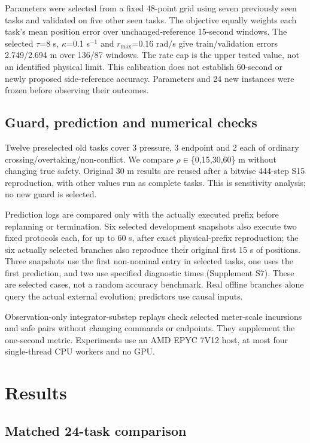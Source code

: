 \documentclass[conference]{IEEEtran}
\begin{document}
Parameters were selected from a fixed 48-point grid using seven previously seen tasks and validated on five other seen tasks. The objective equally weights each task's mean position error over unchanged-reference 15-second windows. The selected \ensuremath{\tau}=8 s, \ensuremath{\kappa}=0.1 s$^{-1}$ and $r_{\max}$=0.16 rad/s give train/validation errors 2.749/2.694 m over 136/87 windows. The rate cap is the upper tested value, not an identified physical limit. This calibration does not establish 60-second or newly proposed side-reference accuracy. Parameters and 24 new instances were frozen before observing their outcomes.

\subsection{Guard, prediction and numerical checks}

Twelve preselected old tasks cover 3 pressure, 3 endpoint and 2 each of ordinary crossing/overtaking/non-conflict. We compare \ensuremath{\rho}\ensuremath{\in}\{0,15,30,60\} m without changing true safety. Original 30 m results are reused after a bitwise 444-step S15 reproduction, with other values run as complete tasks. This is sensitivity analysis; no new guard is selected.

Prediction logs are compared only with the actually executed prefix before replanning or termination. Six selected development snapshots also execute two fixed protocols each, for up to 60 s, after exact physical-prefix reproduction; the six actually selected branches also reproduce their original first 15 s of positions. Three snapshots use the first non-nominal entry in selected tasks, one uses the first prediction, and two use specified diagnostic times (Supplement S7). These are selected cases, not a random accuracy benchmark. Real offline branches alone query the actual external evolution; predictors use causal inputs.

Observation-only integrator-substep replays check selected meter-scale incursions and safe pairs without changing commands or endpoints. They supplement the one-second metric. Experiments use an AMD EPYC 7V12 host, at most four single-thread CPU workers and no GPU.

\section{Results}

\subsection{Matched 24-task comparison}
\end{document}
